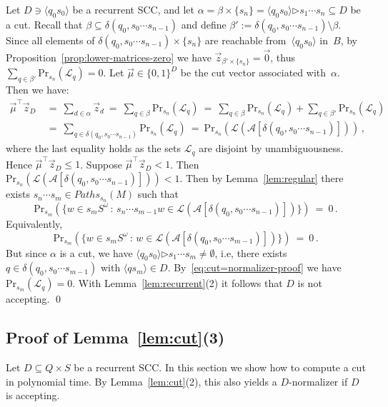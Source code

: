 \documentclass{elsarticle}
\def\<{\langle}
\def\>{\rangle}
\def\cA{\mathcal{A}}
\def\cL{\mathcal{L}}
\def\Pr{\mathrm{Pr}}
\def\Paths{\mathit{Paths}}
\newcommand{\then}{\mathord{\triangleright}}
\begin{document}
Let $D \ni \<q_0 s_0\>$ be a recurrent SCC, and let $\alpha = \beta \times \{s_n\} = \<q_0 s_0\> \then s_1 \cdots s_n \subseteq D$ be a cut.
Recall that $\beta \subseteq \delta(q_0, s_0 \cdots s_{n-1})$ and define $\beta' := \delta(q_0, s_0 \cdots s_{n-1}) \setminus \beta$.
Since all elements of $\delta(q_0, s_0 \cdots s_{n-1}) \times \{s_n\}$ are reachable from~$\<q_0 s_0\>$ in~$B$, by Proposition~\ref{prop:lower-matrices-zero} we have $\vec{z}_{\beta' \times \{s_n\}} = \vec{0}$, thus $\sum_{q \in \beta'} \Pr_{s_n}(\cL_q) = 0$.
Let $\vec{\mu} \in \{0,1\}^D$ be the cut vector associated with~$\alpha$.
Then we have:
\begin{align*}
\vec{\mu}^\top \vec{z}_D
&\ = \ \sum_{d \in \alpha} \vec{z}_d  \ = \ \sum_{q \in \beta} \Pr_{s_n}(\cL_q) \ = \ \sum_{q \in \beta} \Pr_{s_n}(\cL_q) + \sum_{q \in \beta'} \Pr_{s_n}(\cL_q) \\
&\ = \ \sum_{q \in \delta(q_0, s_0 \cdots s_{n-1})} \Pr_{s_n}(\cL_q) \ = \ \Pr_{s_n}( \cL(\cA[\delta(q_0, s_0 \cdots s_{n-1})]))\,, \end{align*}
where the last equality holds as the sets $\cL_q$ are disjoint by unambiguousness.
Hence $\vec{\mu}^\top \vec{z}_D \leqslant 1$.
Suppose $\vec{\mu}^\top \vec{z}_D < 1$.
Then $\Pr_{s_n}( \cL(\cA[\delta(q_0, s_0 \cdots s_{n-1})])) < 1$.
Then by Lemma~\ref{lem:regular} there exists $s_n \cdots s_m \in \Paths_{s_n}(M)$ such that
\[
\Pr_{s_m}(\{ w \in s_m S^\omega \, : \, s_n \cdots s_{m-1} w \in \cL(\cA[\delta(q_0, s_0 \cdots s_{n-1})]) \}) \ = \ 0\,.
\]
Equivalently,
\begin{equation} \label{eq:cut=normalizer-proof}
\Pr_{s_m}(\{ w \in s_m S^\omega \, : \, w \in \cL(\cA[\delta(q_0, s_0 \cdots s_{m-1})]) \}) \ = \ 0\,.
\end{equation}
But since $\alpha$ is a cut, we have $\<q_0 s_0\> \then s_1 \cdots s_m \ne \emptyset$, i.e, there exists $q \in \delta(q_0, s_0 \cdots s_{m-1})$ with $\<q s_m\> \in D$.
By~\eqref{eq:cut=normalizer-proof} we have $\Pr_{s_m}(\cL_q) = 0$.
With Lemma~\ref{lem:recurrent}(2) it follows that $D$ is not accepting.
\qed

\subsection{Proof of Lemma~\ref{lem:cut}(3)} \label{sub:computing-cuts}

Let $D \subseteq Q \times S$ be a recurrent SCC.
In this section we show how to compute a cut in polynomial time.
By Lemma~\ref{lem:cut}(2), this also yields a $D$-normalizer if $D$ is accepting.
\end{document}
